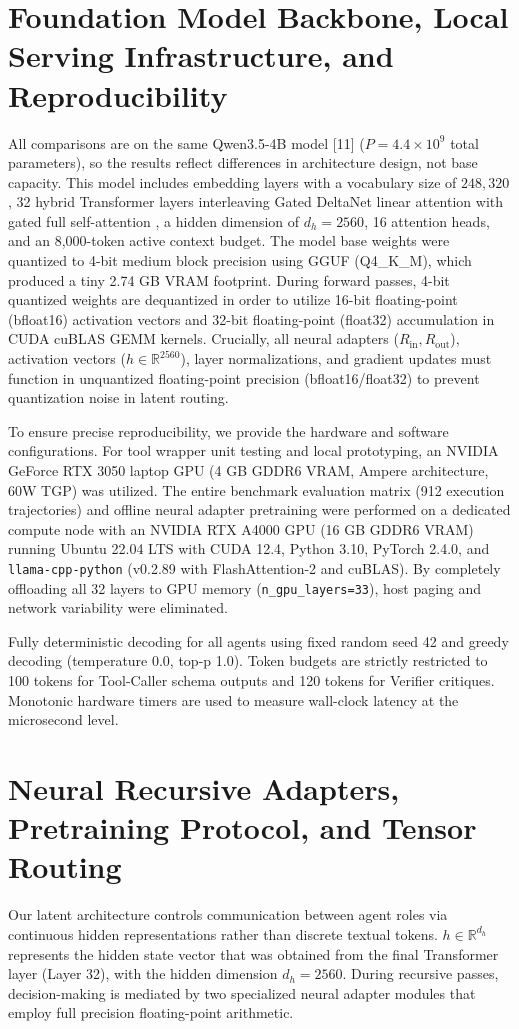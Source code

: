 \documentclass[a4paper, 12pt]{report}
\begin{document}
\section{Foundation Model Backbone, Local Serving Infrastructure, and Reproducibility}
All comparisons are on the same Qwen3.5-4B model [11] ($P = 4.4 \times 10^9$ total parameters), so the results reflect differences in architecture design, not base capacity. This model includes embedding layers with a vocabulary size of $248{,}320$, 32 hybrid Transformer layers interleaving Gated DeltaNet linear attention with gated full self-attention \cite{qwen2026team}, a hidden dimension of $d_h = 2560$, 16 attention heads, and an 8,000-token active context budget. The model base weights were quantized to 4-bit medium block precision using GGUF (Q4\_K\_M), which produced a tiny 2.74 GB VRAM footprint. During forward passes, 4-bit quantized weights are dequantized in order to utilize 16-bit floating-point (bfloat16) activation vectors and 32-bit floating-point (float32) accumulation in CUDA cuBLAS GEMM kernels. Crucially, all neural adapters ($R_{\text{in}}, R_{\text{out}}$), activation vectors ($h \in \mathbb{R}^{2560}$), layer normalizations, and gradient updates must function in unquantized floating-point precision (bfloat16/float32) to prevent quantization noise in latent routing.

To ensure precise reproducibility, we provide the hardware and software configurations. For tool wrapper unit testing and local prototyping, an NVIDIA GeForce RTX 3050 laptop GPU (4 GB GDDR6 VRAM, Ampere architecture, 60W TGP) was utilized. The entire benchmark evaluation matrix (912 execution trajectories) and offline neural adapter pretraining were performed on a dedicated compute node with an NVIDIA RTX A4000 GPU (16 GB GDDR6 VRAM) running Ubuntu 22.04 LTS with CUDA 12.4, Python 3.10, PyTorch 2.4.0, and \texttt{llama-cpp-python} (v0.2.89 with FlashAttention-2 and cuBLAS). By completely offloading all 32 layers to GPU memory (\texttt{n\_gpu\_layers=33}), host paging and network variability were eliminated.

Fully deterministic decoding for all agents using fixed random seed 42 and greedy decoding (temperature 0.0, top-p 1.0). Token budgets are strictly restricted to 100 tokens for Tool-Caller schema outputs and 120 tokens for Verifier critiques. Monotonic hardware timers are used to measure wall-clock latency at the microsecond level.

\section{Neural Recursive Adapters, Pretraining Protocol, and Tensor Routing}
Our latent architecture controls communication between agent roles via continuous hidden representations rather than discrete textual tokens. $h \in \mathbb{R}^{d_h}$ represents the hidden state vector that was obtained from the final Transformer layer (Layer 32), with the hidden dimension $d_h = 2560$. During recursive passes, decision-making is mediated by two specialized neural adapter modules that employ full precision floating-point arithmetic.
\end{document}
